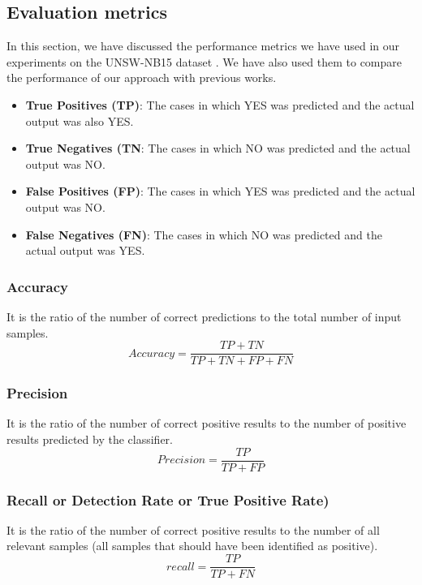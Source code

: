 \documentclass[14pt, conference]{IEEEtran}
\begin{document}
\subsection{Evaluation metrics}
In this section, we have discussed the performance metrics we have used in our experiments on the UNSW-NB15 dataset \cite{moustafa2015unsw}. We have also used them to compare the performance of our approach with previous works.

\begin{itemize}
    \item \textbf{True Positives (TP)}: The cases in which YES was predicted and the actual output was also YES.
    \item \textbf{True Negatives (TN}: The cases in which NO was predicted and the actual output was NO.
    \item \textbf{False Positives (FP)}: The cases in which YES was predicted and the actual output was NO.
    \item \textbf{False Negatives (FN)}: The cases in which NO was predicted and the actual output was YES.
\end{itemize}

\subsubsection{Accuracy}
It is the ratio of the number of correct predictions to the total number of input samples.
\begin{equation}
    Accuracy = \frac{TP+TN}{TP+TN+FP+FN}
\end{equation}

\subsubsection{Precision}
It is the ratio of the number of correct positive results to the number of positive results predicted by the classifier.
\begin{equation}
    Precision = \frac{TP}{TP+FP}
\end{equation}

\subsubsection{Recall or Detection Rate or True Positive Rate)}
It is the ratio of the number of correct positive results to the number of all relevant samples (all samples that should
have been identified as positive).
\begin{equation}
    recall = \frac{TP}{TP+FN}
\end{equation}
\end{document}
